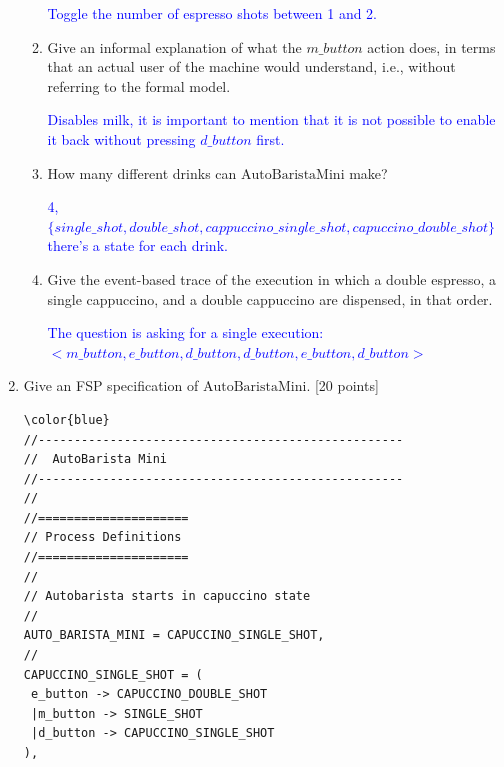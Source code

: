 \documentclass[12pt,fleqn]{article}
\begin{document}
\begin{enumerate}
\begin{enumerate}
\textcolor{blue}{Toggle the number of espresso shots between 1 and 2.}


\item Give an informal explanation of what the $m\_button$ action does, in terms that an actual user of the machine would understand, i.e., without referring to the formal model.

\textcolor{blue}{Disables milk, it is important to mention that it is not possible to enable it back without pressing $d\_button$ first.}


\item How many different drinks can $\mathrm{AutoBaristaMini}$ make?

\textcolor{blue}{4, $\{single\_shot, double\_shot, cappuccino\_single\_shot, capuccino\_double\_shot\}$ there's a state for each drink.}


\item Give the event-based trace of the execution in which a double espresso, a single cappuccino, and a double cappuccino are dispensed, in that order.

  \textcolor{blue}{The question is asking for a single execution: \\
    $<m\_button, e\_button, d\_button, d\_button, e\_button, d\_button>$
  }  
\end{enumerate}

\clearpage

\item Give an FSP specification of $\mathrm{AutoBaristaMini}$. [20 points]

\begin{verbatim}
\color{blue}
//---------------------------------------------------
//  AutoBarista Mini
//---------------------------------------------------
//
//=====================
// Process Definitions
//=====================
//
// Autobarista starts in capuccino state
//
AUTO_BARISTA_MINI = CAPUCCINO_SINGLE_SHOT,
//
CAPUCCINO_SINGLE_SHOT = (
 e_button -> CAPUCCINO_DOUBLE_SHOT
 |m_button -> SINGLE_SHOT
 |d_button -> CAPUCCINO_SINGLE_SHOT 
),


\end{verbatim}
\end{enumerate}
\end{document}
